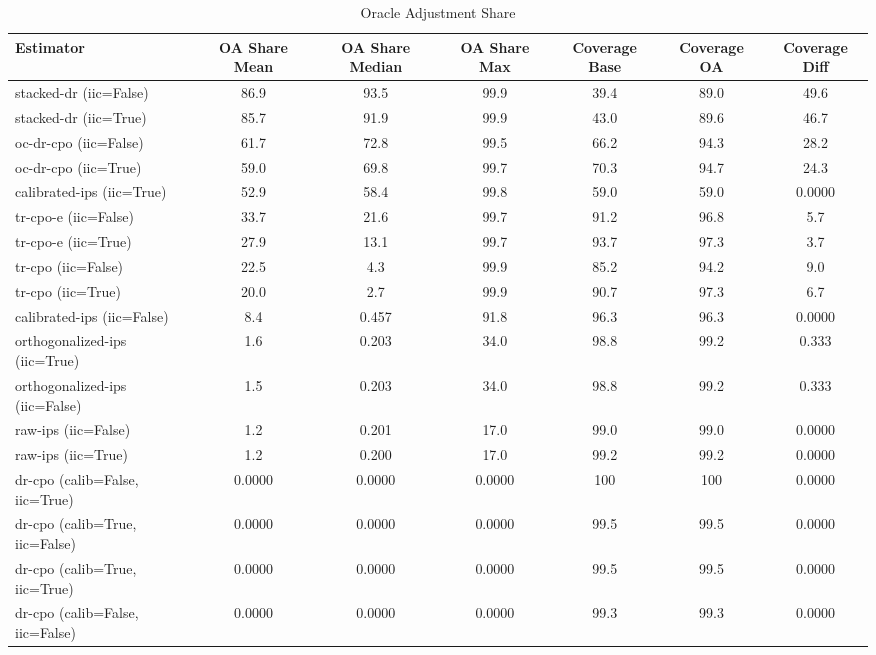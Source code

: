\begin{table}[htbp]
\centering
\caption{Oracle Adjustment Share}
\label{tab:A4}
\begin{tabular}{l|cccccc}
\toprule
Estimator & OA Share Mean & OA Share Median & OA Share Max & Coverage Base & Coverage OA & Coverage Diff \\
\midrule
stacked-dr (iic=False) & 86.9 & 93.5 & 99.9 & 39.4 & 89.0 & 49.6 \\
stacked-dr (iic=True) & 85.7 & 91.9 & 99.9 & 43.0 & 89.6 & 46.7 \\
oc-dr-cpo (iic=False) & 61.7 & 72.8 & 99.5 & 66.2 & 94.3 & 28.2 \\
oc-dr-cpo (iic=True) & 59.0 & 69.8 & 99.7 & 70.3 & 94.7 & 24.3 \\
calibrated-ips (iic=True) & 52.9 & 58.4 & 99.8 & 59.0 & 59.0 & 0.0000 \\
tr-cpo-e (iic=False) & 33.7 & 21.6 & 99.7 & 91.2 & 96.8 & 5.7 \\
tr-cpo-e (iic=True) & 27.9 & 13.1 & 99.7 & 93.7 & 97.3 & 3.7 \\
tr-cpo (iic=False) & 22.5 & 4.3 & 99.9 & 85.2 & 94.2 & 9.0 \\
tr-cpo (iic=True) & 20.0 & 2.7 & 99.9 & 90.7 & 97.3 & 6.7 \\
calibrated-ips (iic=False) & 8.4 & 0.457 & 91.8 & 96.3 & 96.3 & 0.0000 \\
orthogonalized-ips (iic=True) & 1.6 & 0.203 & 34.0 & 98.8 & 99.2 & 0.333 \\
orthogonalized-ips (iic=False) & 1.5 & 0.203 & 34.0 & 98.8 & 99.2 & 0.333 \\
raw-ips (iic=False) & 1.2 & 0.201 & 17.0 & 99.0 & 99.0 & 0.0000 \\
raw-ips (iic=True) & 1.2 & 0.200 & 17.0 & 99.2 & 99.2 & 0.0000 \\
dr-cpo (calib=False, iic=True) & 0.0000 & 0.0000 & 0.0000 & 100 & 100 & 0.0000 \\
dr-cpo (calib=True, iic=False) & 0.0000 & 0.0000 & 0.0000 & 99.5 & 99.5 & 0.0000 \\
dr-cpo (calib=True, iic=True) & 0.0000 & 0.0000 & 0.0000 & 99.5 & 99.5 & 0.0000 \\
dr-cpo (calib=False, iic=False) & 0.0000 & 0.0000 & 0.0000 & 99.3 & 99.3 & 0.0000 \\
\bottomrule
\end{tabular}
\end{table}